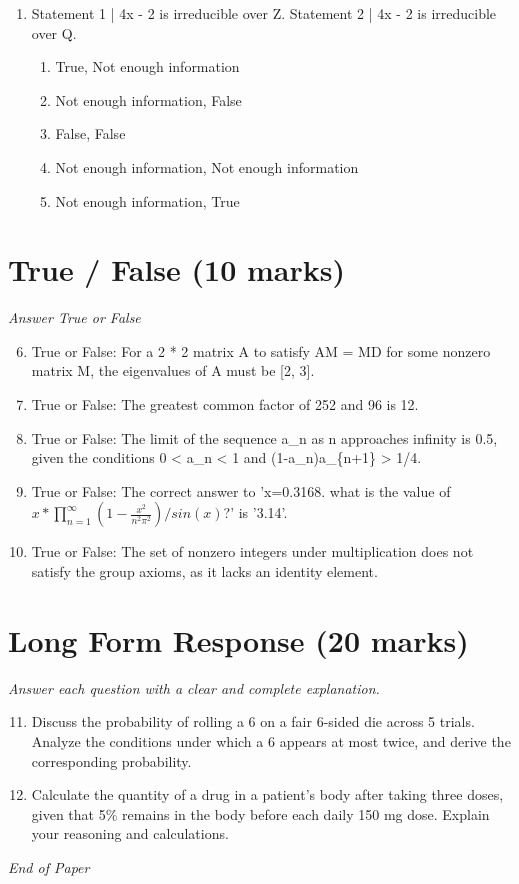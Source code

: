 \documentclass[12pt]{article}
\begin{document}
\begin{enumerate}[label=\arabic*.]
\begin{enumerate}[label=(\alph*)]
    \item 420
    \item 447
    \item 375
\end{enumerate}
\item Statement 1 | 4x - 2 is irreducible over Z. Statement 2 | 4x - 2 is irreducible over Q.
\begin{enumerate}[label=(\alph*)]
    \item True, Not enough information
    \item Not enough information, False
    \item False, False
    \item Not enough information, Not enough information
    \item Not enough information, True
\end{enumerate}
\end{enumerate}

\section*{True / False (10 marks)}
\textit{Answer True or False}
\begin{enumerate}[label=\arabic*.]
\setcounter{enumi}{5}
\item True or False: For a 2 * 2 matrix A to satisfy AM = MD for some nonzero matrix M, the eigenvalues of A must be [2, 3].
\item True or False: The greatest common factor of 252 and 96 is 12.
\item True or False: The limit of the sequence a\_n as n approaches infinity is 0.5, given the conditions 0 \textless{} a\_n \textless{} 1 and (1-a\_n)a\_\{n+1\} \textgreater{} 1/4.
\item True or False: The correct answer to 'x=0.3168. what is the value of $x*\prod_{n=1}^\infty(1-\frac{x^2}{n^2 \pi^2})/sin(x)$?' is '3.14'.
\item True or False: The set of nonzero integers under multiplication does not satisfy the group axioms, as it lacks an identity element.
\end{enumerate}

\section*{Long Form Response (20 marks)}
\textit{Answer each question with a clear and complete explanation.}
\begin{enumerate}[label=\arabic*.]
\setcounter{enumi}{10}
\item Discuss the probability of rolling a 6 on a fair 6-sided die across 5 trials. Analyze the
conditions under which a 6 appears at most twice, and derive the corresponding
probability.
\item Calculate the quantity of a drug in a patient’s body after taking three doses, given that
5\% remains in the body before each daily 150 mg dose. Explain your reasoning and
calculations.
\end{enumerate}

\vfill
\noindent\textit{End of Paper}
\end{document}
